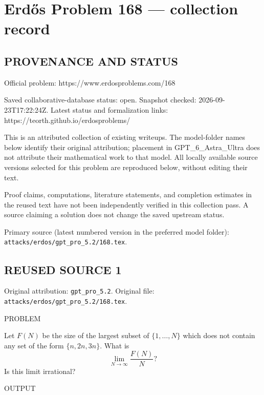 \section*{Erd\H{o}s Problem 168 --- collection record}

\subsection*{PROVENANCE AND STATUS}
Official problem: https://www.erdosproblems.com/168

Saved collaborative-database status: open.
Snapshot checked: 2026-09-23T17:22:24Z.
Latest status and formalization links: https://teorth.github.io/erdosproblems/

This is an attributed collection of existing writeups. The model-folder names below identify their original attribution; placement in GPT\_6\_Astra\_Ultra does not attribute their mathematical work to that model. All locally available source versions selected for this problem are reproduced below, without editing their text.

Proof claims, computations, literature statements, and completion estimates in the reused text have not been independently verified in this collection pass. A source claiming a solution does not change the saved upstream status.

Primary source (latest numbered version in the preferred model folder): \texttt{attacks/erdos/gpt\_pro\_5.2/168.tex}.

\subsection*{REUSED SOURCE 1}
Original attribution: \texttt{gpt\_pro\_5.2}.
Original file: \texttt{attacks/erdos/gpt\_pro\_5.2/168.tex}.


PROBLEM

Let $F(N)$ be the size of the largest subset of $\{1,\ldots,N\}$ which does not contain any set of the form $\{n,2n,3n\}$. What is
\[ \lim_{N\to \infty}\frac{F(N)}{N}?\]
Is this limit irrational?

OUTPUT

